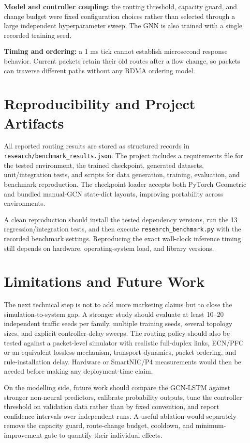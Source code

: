 \documentclass[conference]{IEEEtran}
\begin{document}
\textbf{Model and controller coupling:} the routing threshold, capacity guard, and change budget were fixed configuration choices rather than selected through a large independent hyperparameter sweep. The GNN is also trained with a single recorded training seed.

\textbf{Timing and ordering:} a 1 ms tick cannot establish microsecond response behavior. Current packets retain their old routes after a flow change, so packets can traverse different paths without any RDMA ordering model.

\section{Reproducibility and Project Artifacts}
All reported routing results are stored as structured records in \texttt{research/benchmark\_results.json}. The project includes a requirements file for the tested environment, the trained checkpoint, generated datasets, unit/integration tests, and scripts for data generation, training, evaluation, and benchmark reproduction. The checkpoint loader accepts both PyTorch Geometric and bundled manual-GCN state-dict layouts, improving portability across environments.

A clean reproduction should install the tested dependency versions, run the 13 regression/integration tests, and then execute \texttt{research\_benchmark.py} with the recorded benchmark settings. Reproducing the exact wall-clock inference timing still depends on hardware, operating-system load, and library versions.

\section{Limitations and Future Work}
The next technical step is not to add more marketing claims but to close the simulation-to-system gap. A stronger study should evaluate at least 10--20 independent traffic seeds per family, multiple training seeds, several topology sizes, and explicit controller-delay sweeps. The routing policy should also be tested against a packet-level simulator with realistic full-duplex links, ECN/PFC or an equivalent lossless mechanism, transport dynamics, packet ordering, and rule-installation delay. Hardware or SmartNIC/P4 measurements would then be needed before making any deployment-time claim.

On the modelling side, future work should compare the GCN-LSTM against stronger non-neural predictors, calibrate probability outputs, tune the controller threshold on validation data rather than by fixed convention, and report confidence intervals over independent runs. A useful ablation would separately remove the capacity guard, route-change budget, cooldown, and minimum-improvement gate to quantify their individual effects.
\end{document}
